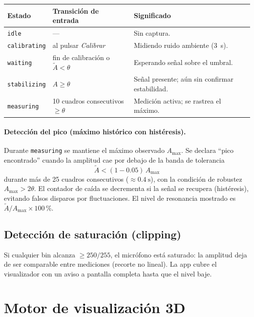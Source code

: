 \documentclass[11pt,a4paper]{article}
\begin{document}
\begin{center}
\begin{tabular}{@{}llp{7.2cm}@{}}
\toprule
Estado & Transición de entrada & Significado \\
\midrule
\texttt{idle} & --- & Sin captura. \\
\texttt{calibrating} & al pulsar \emph{Calibrar} & Midiendo ruido ambiente (\SI{3}{\second}). \\
\texttt{waiting} & fin de calibración o $\tilde{A} < \theta$ & Esperando señal sobre el umbral. \\
\texttt{stabilizing} & $A \ge \theta$ & Señal presente; aún sin confirmar estabilidad. \\
\texttt{measuring} & 10 cuadros consecutivos $\ge \theta$ & Medición activa; se rastrea el máximo. \\
\bottomrule
\end{tabular}
\end{center}

\paragraph{Detección del pico (máximo histórico con histéresis).} Durante
\texttt{measuring} se mantiene el máximo observado $A_{\max}$. Se declara ``pico encontrado''
cuando la amplitud cae por debajo de la banda de tolerancia
\begin{equation}
  \tilde{A} < (1 - 0.05)\,A_{\max}
\end{equation}
durante más de 25 cuadros consecutivos ($\approx \SI{0.4}{\second}$), con la condición de
robustez $A_{\max} > 2\theta$. El contador de caída se decrementa si la señal se recupera
(histéresis), evitando falsos disparos por fluctuaciones. El nivel de resonancia mostrado es
$\tilde{A}/A_{\max} \times 100\,\%$.

\subsection{Detección de saturación (clipping)}

Si cualquier bin alcanza $\ge 250/255$, el micrófono está saturado: la amplitud deja de ser
comparable entre mediciones (recorte no lineal). La app cubre el visualizador con un aviso a
pantalla completa hasta que el nivel baje.

\section{Motor de visualización 3D}
\end{document}
